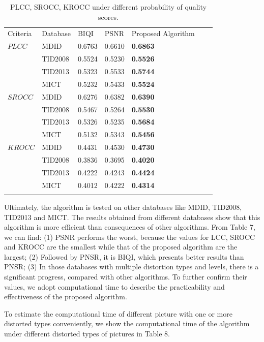 \begin{table}
\caption{PLCC, SROCC, KROCC under different probability of quality scores.}
\label{tab:5}       
\begin{tabular}{lllllll}
\hline\noalign{\smallskip}
Criteria & Database & BIQI & PSNR & Proposed Algorithm &\\
\noalign{\smallskip}\hline\noalign{\smallskip}
$PLCC		$  &MDID    		&0.6763			&0.6610		&\textbf{0.6863}\\
$			$  &TID2008    		&0.5524			&0.5230 		&\textbf{0.5526}\\
$			$  &TID2013    		&0.5323			&0.5533 		&\textbf{0.5744}\\
$			$  &MICT    		&0.5232			&0.5433 		&\textbf{0.5524}\\ %
$SROCC		$  &MDID    		&0.6276			&0.6382 		&\textbf{0.6390}\\
$			$  &TID2008    		&0.5467			&0.5264 		&\textbf{0.5530}\\
$			$  &TID2013    		&0.5326			&0.5235 		&\textbf{0.5684}\\
$			$  &MICT    		&0.5132			&0.5343 		&\textbf{0.5456}\\ %
$KROCC		$  &MDID    		&0.4431			&0.4530 		&\textbf{0.4730}\\
$			$  &TID2008    		&0.3836			&0.3695 		&\textbf{0.4020}\\
$			$  &TID2013    		&0.4222			&0.4243 		&\textbf{0.4424}\\
$			$  &MICT    		&0.4012			&0.4222 		&\textbf{0.4314}\\ %
\noalign{\smallskip}\hline
\end{tabular}
\end{table}





Ultimately, the algorithm is tested on other databases like MDID, TID2008, TID2013 and MICT. The results obtained from different databases show that this algorithm is more efficient than consequences of other algorithms. From Table 7, we can find: (1) PSNR performs the worst, because the values for LCC, SROCC and KROCC are the smallest while that of the proposed algorithm are the largest; (2) Followed by PNSR, it is BIQI, which presents better results than PNSR; (3) In those databases with multiple distortion types and levels, there is a significant progress, compared with other algorithms. To further confirm their values, we adopt computational time to describe the practicability and effectiveness of the proposed algorithm. 
\par To estimate the computational time of different picture with one or more distorted types conveniently, we show the computational time of the algorithm under different distorted types of pictures in Table 8.


